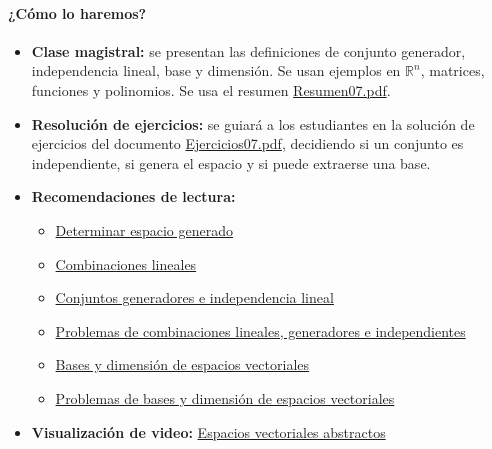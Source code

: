 \documentclass[a4,11pt]{aleph-notas}
\begin{document}
\paragraph{¿Cómo lo haremos?}
\begin{itemize}[leftmargin=*]
    \item \textbf{Clase magistral:} se presentan las definiciones de conjunto generador, independencia lineal, base y dimensión. Se usan ejemplos en $\mathbb{R}^n$, matrices, funciones y polinomios. Se usa el resumen \href{https://fcena-puce.github.io/AlgebraLineal-05-N0048/01Resumen/Resumen07.pdf}{Resumen07.pdf}.
    \item \textbf{Resolución de ejercicios:} se guiará a los estudiantes en la solución de ejercicios del documento \href{https://fcena-puce.github.io/AlgebraLineal-05-N0048/04Ejercicios/Ejercicios07.pdf}{Ejercicios07.pdf}, decidiendo si un conjunto es independiente, si genera el espacio y si puede extraerse una base.
    \item \textbf{Recomendaciones de lectura:} 
    \begin{itemize}
        \item \href{https://alephsub0.org/material-nuevo/acaicedo/determinar-espacio-generado/}{Determinar espacio generado}
        \item \href{https://blog.nekomath.com/algebra-lineal-i-combinaciones-lineales/}{Combinaciones lineales}
        \item \href{https://blog.nekomath.com/algebra-lineal-i-conjuntos-generadores-independencia-lineal-y-bases/}{Conjuntos generadores e independencia lineal}
        \item \href{https://blog.nekomath.com/algebra-lineal-i-problemas-de-combinaciones-lineales-generadores-e-independientes/}{Problemas de combinaciones lineales, generadores e independientes}
        \item \href{https://blog.nekomath.com/algebra-lineal-i-bases-y-dimension-de-espacios-vectoriales/}{Bases y dimensión de espacios vectoriales}
        \item \href{https://blog.nekomath.com/algebra-lineal-i-problemas-de-bases-y-dimension-de-espacios-vectoriales/}{Problemas de bases y dimensión de espacios vectoriales}
    \end{itemize}
    \item \textbf{Visualización de video:} \href{https://youtu.be/TgKwz5Ikpc8?si=7z5e-PTXFkTK7szh}{Espacios vectoriales abstractos}
\end{itemize}
\end{document}
